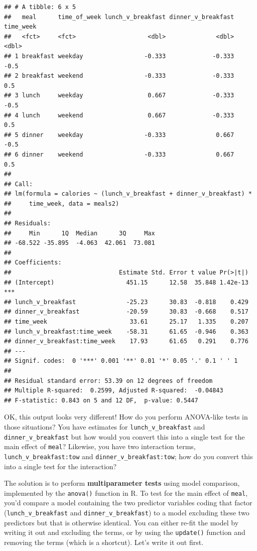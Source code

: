 \documentclass[]{book}
\begin{document}
\begin{verbatim}
## # A tibble: 6 x 5
##   meal      time_of_week lunch_v_breakfast dinner_v_breakfast time_week
##   <fct>     <fct>                    <dbl>              <dbl>     <dbl>
## 1 breakfast weekday                 -0.333             -0.333      -0.5
## 2 breakfast weekend                 -0.333             -0.333       0.5
## 3 lunch     weekday                  0.667             -0.333      -0.5
## 4 lunch     weekend                  0.667             -0.333       0.5
## 5 dinner    weekday                 -0.333              0.667      -0.5
## 6 dinner    weekend                 -0.333              0.667       0.5
## 
## Call:
## lm(formula = calories ~ (lunch_v_breakfast + dinner_v_breakfast) * 
##     time_week, data = meals2)
## 
## Residuals:
##     Min      1Q  Median      3Q     Max 
## -68.522 -35.895  -4.063  42.061  73.081 
## 
## Coefficients:
##                              Estimate Std. Error t value Pr(>|t|)    
## (Intercept)                    451.15      12.58  35.848 1.42e-13 ***
## lunch_v_breakfast              -25.23      30.83  -0.818    0.429    
## dinner_v_breakfast             -20.59      30.83  -0.668    0.517    
## time_week                       33.61      25.17   1.335    0.207    
## lunch_v_breakfast:time_week    -58.31      61.65  -0.946    0.363    
## dinner_v_breakfast:time_week    17.93      61.65   0.291    0.776    
## ---
## Signif. codes:  0 '***' 0.001 '**' 0.01 '*' 0.05 '.' 0.1 ' ' 1
## 
## Residual standard error: 53.39 on 12 degrees of freedom
## Multiple R-squared:  0.2599,	Adjusted R-squared:  -0.04843 
## F-statistic: 0.843 on 5 and 12 DF,  p-value: 0.5447
\end{verbatim}

OK, this output looks very different! How do you perform ANOVA-like tests in those situations? You have estimates for \texttt{lunch\_v\_breakfast} and \texttt{dinner\_v\_breakfast} but how would you convert this into a single test for the main effect of \texttt{meal}? Likewise, you have two interaction terms, \texttt{lunch\_v\_breakfast:tow} and \texttt{dinner\_v\_breakfast:tow}; how do you convert this into a single test for the interaction?

The solution is to perform \textbf{multiparameter tests} using model comparison, implemented by the \texttt{anova()} function in R. To test for the main effect of \texttt{meal}, you'd compare a model containing the two predictor variables coding that factor (\texttt{lunch\_v\_breakfast} and \texttt{dinner\_v\_breakfast}) to a model excluding these two predictors but that is otherwise identical. You can either re-fit the model by writing it out and excluding the terms, or by using the \texttt{update()} function and removing the terms (which is a shortcut). Let's write it out first.
\end{document}

